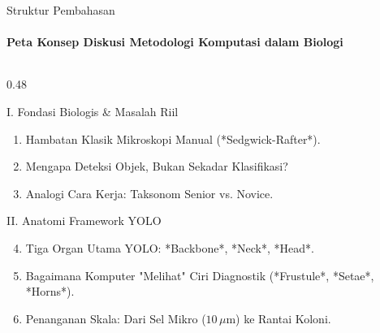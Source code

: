 \documentclass[aspectratio=169, 10pt]{beamer}
\begin{document}
\begin{frame}{Struktur Pembahasan}
    \framesubtitle{Peta Konsep Diskusi Metodologi Komputasi dalam Biologi}
    
    \begin{columns}[T]
        \begin{column}{0.48\textwidth}
            \begin{biocard}{I. Fondasi Biologis \& Masalah Riil}
                \scriptsize
                \begin{enumerate}\setlength\itemsep{4pt}
                    \item Hambatan Klasik Mikroskopi Manual (*Sedgwick-Rafter*).
                    \item Mengapa Deteksi Objek, Bukan Sekadar Klasifikasi?
                    \item Analogi Cara Kerja: Taksonom Senior vs. Novice.
                \end{enumerate}
            \end{biocard}
            \vspace{3pt}
            \begin{conceptcard}{II. Anatomi Framework YOLO}
                \scriptsize
                \begin{enumerate}\setcounter{enumi}{3}\setlength\itemsep{4pt}
                    \item Tiga Organ Utama YOLO: *Backbone*, *Neck*, *Head*.
                    \item Bagaimana Komputer "Melihat" Ciri Diagnostik (*Frustule*, *Setae*, *Horns*).
                    \item Penanganan Skala: Dari Sel Mikro ($10\,\mu\text{m}$) ke Rantai Koloni.
                \end{enumerate}
            \end{conceptcard}
        \end{column}
        

\end{columns}
\end{frame}
\end{document}
